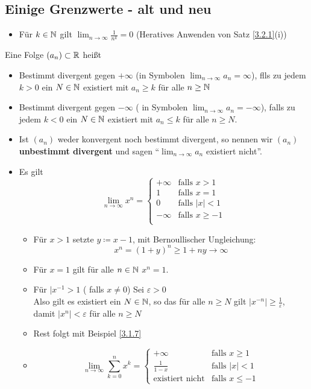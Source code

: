 \documentclass[consecutivenumbering]{gadsescript}
\begin{document}
\subsection{Einige Grenzwerte - alt und neu}
\begin{itemize}
	\item Für $ k \in \mathbb{N} $ gilt $ \lim_{n\to\infty} \frac{1}{n^k} = 0 $ (Heratives Anwenden von Satz \ref{3.2.1}(i))
\end{itemize}
\begin{subdefinition}
	Eine Folge $ (a_n)\subset \mathbb{R} $ heißt
	\begin{itemize}
		\item Bestimmt divergent gegen $+\infty$ (in Symbolen $ \lim_{n\to\infty} a_n = \infty $), flls zu jedem $ k > 0 $ ein $ N \in \mathbb{N} $ existiert mit $ a_n \geq k $ für alle $ n \geq \mathbb{N} $
		\item Bestimmt divergent gegen $ - \infty $ ( in Symbolen $ \lim_{n\to\infty} a_n = -\infty $), falls zu jedem $ k < 0 $ ein $ N \in \mathbb{N} $ existiert mit $ a_n \leq k $ für alle $ n \geq N $.
		\item Ist $ (a_n) $ weder konvergent noch bestimmt divergent, so nennen wir $ (a_n) $ \textbf{unbestimmt divergent} und sagen ``$\lim_{n\to\infty} a_n$ existiert nicht''.
	\end{itemize}
\end{subdefinition}

\begin{itemize}
	\item Es gilt
		\[ \lim_{n\to\infty} x^n =
		\begin{cases}
			+\infty	& \text{falls } x > 1\\
			1	& \text{falls } x = 1\\
			0	& \text{falls } |x| < 1\\
			-\infty	& \text{falls } x \geq -1\\
		\end{cases}
		\]
		\begin{itemize}
			\item Für $ x > 1 $ setzte $ y \coloneqq x - 1$, mit Bernoullischer Ungleichung:
				\[ x^n = (1+y)^n \geq 1 + ny \to\infty \]
			\item Für $ x = 1 $ gilt für alle $ n \in \mathbb{N} $ $ x^n = 1 $.
			\item Für $ |x^{-1} > 1 $ ( falls $ x \neq 0 $) Sei $ \varepsilon > 0 $\\
				Also gilt es existiert ein $ N \in \mathbb{N} $, so das für alle $ n \geq N $ gilt $ | x^{-n} | \geq \frac{1}{\varepsilon} $, damit $ |x^n| < \varepsilon $ für alle $ n \geq N $
			\item Rest folgt mit Beispiel \ref{3.1.7}
			\item \[ \lim_{n\to\infty} \sum_{k=0}^n x^k =
				\begin{cases}
					+\infty			& \text{falls } x \geq 1\\
					\frac{1}{1-x} 		& \text{falls } |x| < 1\\
					\text{existiert nicht}	& \text{falls } x \leq -1
				\end{cases}
				\]
		\end{itemize}
\end{itemize}
\end{document}
